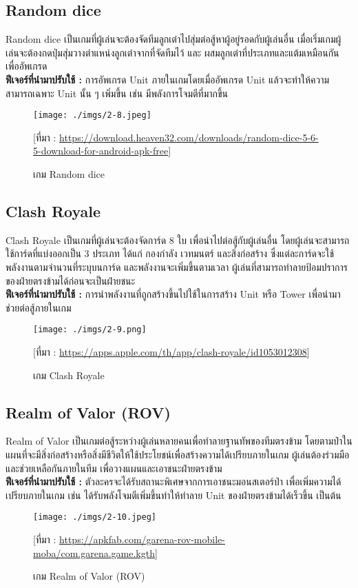 \documentclass[12pt,oneside,openright,a4paper]{cpe-thai-project}
\begin{document}
\pagebreak
\subsection{Random dice}
Random dice เป็นเกมที่ผู้เล่นจะต้องจัดทีมลูกเต๋าไปสุ่มต่อสู้หาผู้อยู่รอดกับผู้เล่นอื่น 
เมื่อเริ่มเกมผู้เล่นจะต้องกดปุ่มสุ่มวางตำแหน่งลูกเต๋าจากที่จัดทีมไว้ และ 
ผสมลูกเต๋าที่ประเภทและแต้มเหมือนกันเพื่ออัพเกรด\\
\textbf{ฟีเจอร์ที่นำมาปรับใช้ : } การอัพเกรด Unit ภายในเกมโดยเมื่ออัพเกรด Unit 
แล้วจะทำให้ความสามารถเฉพาะ Unit นั้น ๆ เพิ่มขึ้น เช่น มีพลังการโจมตีที่มากขึ้น
\begin{figure}[H]\centering
  \texttt{[image: ./imgs/2-8.jpeg]}
  \caption{เกม Random dice}\label{fig:2-8}
  \small [ที่มา : \url{https://download.heaven32.com/downloads/random-dice-5-6-5-download-for-android-apk-free}]
\end{figure}


\subsection{Clash Royale}
Clash Royale เป็นเกมที่ผู้เล่นจะต้องจัดการ์ด 8 ใบ เพื่อนำไปต่อสู้กับผู้เล่นอื่น 
โดยผู้เล่นจะสามารถใช้การ์ดที่แบ่งออกเป็น 3 ประเภท ได้แก่ กองกำลัง เวทมนตร์ และสิ่งก่อสร้าง 
ซึ่งแต่ละการ์ดจะใช้พลังงานตามจำนวนที่ระบุบนการ์ด และพลังงานจะเพิ่มขึ้นตามเวลา 
ผู้เล่นที่สามารถทำลายป้อมปราการของฝ่ายตรงข้ามได้ก่อนจะเป็นฝ่ายชนะ\\
\textbf{ฟีเจอร์ที่นำมาปรับใช้ : } การนำพลังงานที่ถูกสร้างขึ้นไปใช้ในการสร้าง 
Unit หรือ Tower เพื่อนำมาช่วยต่อสู้ภายในเกม
\begin{figure}[H]\centering
  \texttt{[image: ./imgs/2-9.png]}
  \caption{เกม Clash Royale}\label{fig:2-9}
  \small [ที่มา : \url{https://apps.apple.com/th/app/clash-royale/id1053012308}]
\end{figure}

\pagebreak
\subsection{Realm of Valor (ROV)}
Realm of Valor เป็นเกมต่อสู้ระหว่างผู้เล่นหลายคนเพื่อทำลายฐานทัพของทีมตรงข้าม 
โดยตามป่าในแผนที่จะมีสิ่งก่อสร้างหรือสิ่งมีชีวิตให้ใช้ประโยชน์เพื่อสร้างความได้เปรียบภายในเกม 
ผู้เล่นต้องร่วมมือและช่วยเหลือกันภายในทีม เพื่อวางแผนและเอาชนะฝ่ายตรงข้าม\\
\textbf{ฟีเจอร์ที่นำมาปรับใช้ : } ตัวละครจะได้รับสถานะพิเศษจากการเอาชนะมอนสเตอร์ป่า 
เพื่อเพิ่มความได้เปรียบภายในเกม เช่น ได้รับพลังโจมตีเพิ่มขึ้นทำให้ทำลาย Unit ของฝ่ายตรงข้ามได้เร็วขึ้น เป็นต้น
\begin{figure}[H]\centering
  \texttt{[image: ./imgs/2-10.jpeg]}
  \caption{เกม Realm of Valor (ROV)}\label{fig:2-10}
  \small [ที่มา : \url{https://apkfab.com/garena-rov-mobile-moba/com.garena.game.kgth}]
\end{figure}
\end{document}
